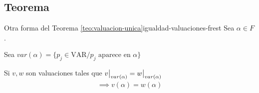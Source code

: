 \subsection{Teorema}

\begin{teorema}{Otra forma del Teorema \ref{teo:valuacion-unica}}{igualdad-valuaciones-frest}
    Sea $\alpha \in F$. 

    Sea $var(\alpha) = 
    \{ p_j \in \mathrm{VAR} / p_j \text{ aparece en } \alpha \}$

    \medskip

    Si $v, w$ son valuaciones tales que 
    $\frest{v}{var(\alpha)} = \frest{w}{var(\alpha)}$
    \begin{gather*}
        \implies v(\alpha) = w(\alpha)
    \end{gather*}

\end{teorema}

